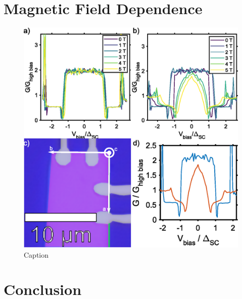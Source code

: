\section{Magnetic Field Dependence}
\begin{figure}
    \centering
    \includegraphics[width = \textwidth]{Chap4/Figures/MagneticField.eps}
    \caption{Caption}
    \label{fig:PARField}
\end{figure}
\section{Conclusion}